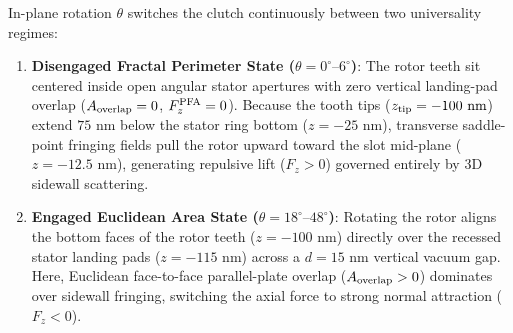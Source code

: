 \documentclass[11pt,letterpaper]{article}
\begin{document}
In-plane rotation $\theta$ switches the clutch continuously between two universality regimes:
\begin{enumerate}
    \item \textbf{Disengaged Fractal Perimeter State ($\theta = 0^\circ\text{--}6^\circ$)}: The rotor teeth sit centered inside open angular stator apertures with zero vertical landing-pad overlap ($A_{\rm overlap} = 0$, $F_z^{\rm PFA} = 0$). Because the tooth tips ($z_{\rm tip} = -100\text{ nm}$) extend $75\text{ nm}$ below the stator ring bottom ($z = -25\text{ nm}$), transverse saddle-point fringing fields pull the rotor upward toward the slot mid-plane ($z = -12.5\text{ nm}$), generating repulsive lift ($F_z > 0$) governed entirely by 3D sidewall scattering.
    \item \textbf{Engaged Euclidean Area State ($\theta = 18^\circ\text{--}48^\circ$)}: Rotating the rotor aligns the bottom faces of the rotor teeth ($z = -100\text{ nm}$) directly over the recessed stator landing pads ($z = -115\text{ nm}$) across a $d = 15\text{ nm}$ vertical vacuum gap. Here, Euclidean face-to-face parallel-plate overlap ($A_{\rm overlap} > 0$) dominates over sidewall fringing, switching the axial force to strong normal attraction ($F_z < 0$).
\end{enumerate}
\end{document}
